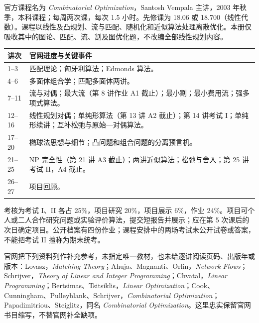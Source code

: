 \par\addvspace{9pt}\par\nobreak\vspace{4pt}
官方课程名为 \textit{Combinatorial Optimization}，Santosh Vempala 主讲，2003 年秋季，本科课程；每周两次课，每次 1.5 小时。先修课为 18.06 或 18.700（线性代数）。课程以线性及凸规划、流与匹配、随机化和近似算法处理离散优化。本册仅吸收其中的图论、匹配、流、割及图优化题，不改编全部线性规划内容。

\begin{longtable}{p{}p{}}
\toprule 讲次 & 官网进度与关键事件\\\midrule\endhead
1--3 & 匹配理论；匈牙利算法；Edmonds 算法。\\
4--6 & 多面体组合学；匹配多面体两讲。\\
7--11 & 流与对偶；最大流（第 8 讲作业 A1 截止）；最小割；最小费用流；强多项式算法。\\
12--16 & 线性规划对偶；单纯形算法（第 13 讲 A2 截止）；第 14 讲考试 I；单纯形续讲；互补松弛与原始—对偶算法。\\
17--20 & 椭球法思想与细节；凸问题和组合问题的分离预言机。\\
21--25 & NP 完全性（第 21 讲 A3 截止）；两讲近似算法；松弛与舍入；第 25 讲考试 II，A4 截止。\\
26--27 & 项目回顾。\\\bottomrule
\end{longtable}
考核为考试 I、II 各占 25\%，项目研究 20\%，项目展示 6\%，作业 24\%。项目可个人或二人合作研究问题或实验评价算法，提交短报告并展示；应在第 5 次课后的次日确定项目。公开档案有四份作业；课程安排中的两场考试未公开试卷或答案，不能把考试 II 擅称为期末统考。

官网把下列资料列作补充参考，未指定唯一教材，也未给逐讲阅读页码、出版年或版本：Lovasz，\textit{Matching Theory}；Ahuja、Magnanti、Orlin，\textit{Network Flows}；Schrijver，\textit{Theory of Linear and Integer Programming}；Chvatal，\textit{Linear Programming}；Bertsimas、Tsitsiklis，\textit{Linear Optimization}；Cook、Cunningham、Pulleyblank、Schrijver，\textit{Combinatorial Optimization}；Papadimitriou、Steiglitz，同名 \textit{Combinatorial Optimization}。这里忠实保留官网书目缩写，不替官网补全缺项。


